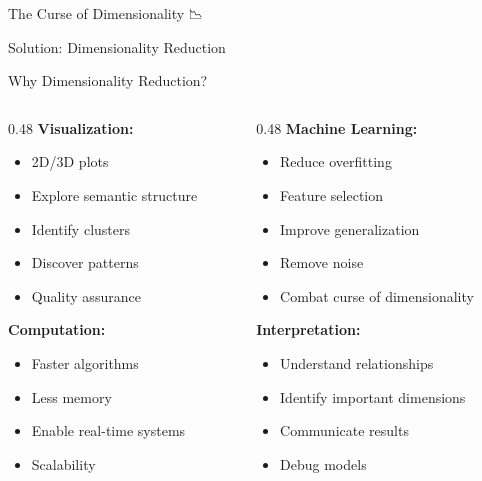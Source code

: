 \documentclass[aspectratio=169]{beamer}
\begin{document}
\begin{frame}[shrink=10]{The Curse of Dimensionality 📉}
\vspace{1em}
\begin{center}
\Large
\alert{Solution: Dimensionality Reduction}
\end{center}
\end{frame}

\begin{frame}[shrink=10]{Why Dimensionality Reduction? 🎯}
\small
\begin{columns}[T]
\begin{column}{0.48\textwidth}
\textbf{Visualization:}
\begin{itemize}\setlength{\itemsep}{0pt}
    \item 2D/3D plots
    \item Explore semantic structure
    \item Identify clusters
    \item Discover patterns
    \item Quality assurance
\end{itemize}

\vspace{0.5em}
\textbf{Computation:}
\begin{itemize}\setlength{\itemsep}{0pt}
    \item Faster algorithms
    \item Less memory
    \item Enable real-time systems
    \item Scalability
\end{itemize}
\end{column}

\begin{column}{0.48\textwidth}
\textbf{Machine Learning:}
\begin{itemize}\setlength{\itemsep}{0pt}
    \item Reduce overfitting
    \item Feature selection
    \item Improve generalization
    \item Remove noise
    \item Combat curse of dimensionality
\end{itemize}

\vspace{0.5em}
\textbf{Interpretation:}
\begin{itemize}\setlength{\itemsep}{0pt}
    \item Understand relationships
    \item Identify important dimensions
    \item Communicate results
    \item Debug models
\end{itemize}
\end{column}
\end{columns}


\end{frame}
\end{document}
